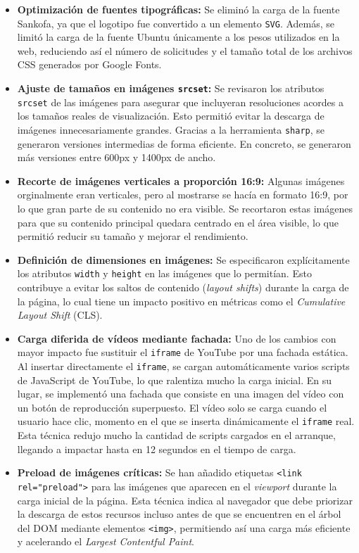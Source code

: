 \documentclass{article}
\begin{document}
\begin{itemize}
    \item \textbf{Optimización de fuentes tipográficas:} Se eliminó la carga de la fuente Sankofa, ya que el logotipo fue convertido a un elemento \texttt{SVG}. Además, se limitó la carga de la fuente Ubuntu únicamente a los pesos utilizados en la web, reduciendo así el número de solicitudes y el tamaño total de los archivos CSS generados por Google Fonts.
    
    \item \textbf{Ajuste de tamaños en imágenes \texttt{srcset}:} Se revisaron los atributos \texttt{srcset} de las imágenes para asegurar que incluyeran resoluciones acordes a los tamaños reales de visualización. Esto permitió evitar la descarga de imágenes innecesariamente grandes. Gracias a la herramienta \texttt{sharp}, se generaron versiones intermedias de forma eficiente. En concreto, se generaron más versiones entre 600px y 1400px de ancho.

    \item \textbf{Recorte de imágenes verticales a proporción 16:9:} Algunas imágenes orginalmente eran verticales, pero al mostrarse se hacía en formato 16:9, por lo que gran parte de su contenido no era visible. Se recortaron estas imágenes para que su contenido principal quedara centrado en el área visible, lo que permitió reducir su tamaño y mejorar el rendimiento.

    \item \textbf{Definición de dimensiones en imágenes:} Se especificaron explícitamente los atributos \texttt{width} y \texttt{height} en las imágenes que lo permitían. Esto contribuye a evitar los saltos de contenido (\textit{layout shifts}) durante la carga de la página, lo cual tiene un impacto positivo en métricas como el \textit{Cumulative Layout Shift} (CLS).

    \item \textbf{Carga diferida de vídeos mediante fachada:} Uno de los cambios con mayor impacto fue sustituir el \texttt{iframe} de YouTube por una fachada estática. Al insertar directamente el \texttt{iframe}, se cargan automáticamente varios scripts de JavaScript de YouTube, lo que ralentiza mucho la carga inicial. En su lugar, se implementó una fachada que consiste en una imagen del vídeo con un botón de reproducción superpuesto. El vídeo solo se carga cuando el usuario hace clic, momento en el que se inserta dinámicamente el \texttt{iframe} real. Esta técnica redujo mucho la cantidad de scripts cargados en el arranque, llegando a impactar hasta en 12 segundos en el tiempo de carga.

    \item \textbf{Preload de imágenes críticas:} Se han añadido etiquetas \texttt{<link rel="preload">} para las imágenes que aparecen en el \textit{viewport} durante la carga inicial de la página. Esta técnica indica al navegador que debe priorizar la descarga de estos recursos incluso antes de que se encuentren en el árbol del DOM mediante elementos \texttt{<img>}, permitiendo así una carga más eficiente y acelerando el \textit{Largest Contentful Paint}.

\end{itemize}
\end{document}
